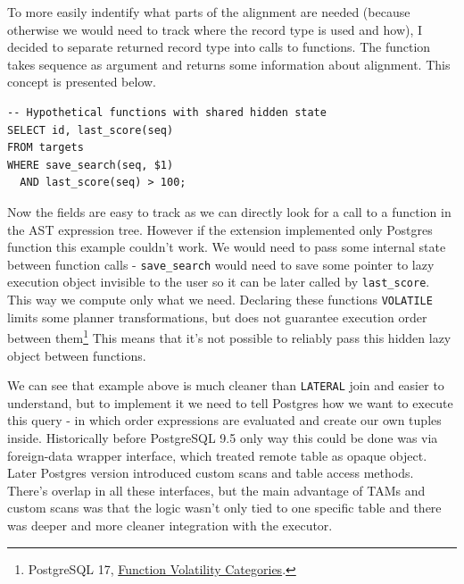 To more easily indentify what parts of the alignment are needed (because otherwise we would need to track where the record type is used and how), I decided to separate returned record type into calls to functions.
The function takes sequence as argument and returns some information about alignment. This concept is presented below.

\noindent\begin{minipage}{\linewidth}
\begin{lstlisting}[style=bioseq-search-sql,caption={Hidden state does not establish an evaluation order.}]
-- Hypothetical functions with shared hidden state
SELECT id, last_score(seq)
FROM targets
WHERE save_search(seq, $1)
  AND last_score(seq) > 100;
\end{lstlisting}
\end{minipage}

Now the fields are easy to track as we can directly look for a call to a function in the AST expression tree. 
However if the extension implemented only Postgres function this example couldn't work. 
We would need to pass some internal state between function calls - \texttt{save\_search} would need to save some pointer
to lazy execution object invisible to the user so it can be later called by \texttt{last\_score}. This way we compute only what we need.
Declaring these functions \texttt{VOLATILE} limits some planner transformations, but does not
guarantee execution order between them\footnote{PostgreSQL 17,
\href{https://www.postgresql.org/docs/17/xfunc-volatility.html}
{Function Volatility Categories}.}
This means that it's not possible to reliably pass this hidden lazy object between functions.

We can see that example above is much cleaner than \texttt{LATERAL} join and easier to understand, but to implement it we need to 
tell Postgres how we want to execute this query - in which order expressions are evaluated and create our own tuples inside.
Historically before PostgreSQL 9.5 only way this could be done was via foreign-data wrapper interface, which treated remote table as opaque object.
Later Postgres version introduced custom scans and table access methods. There's overlap in all these interfaces, but the main advantage of TAMs and custom scans was
that the logic wasn't only tied to one specific table and there was deeper and more cleaner integration with the executor.

